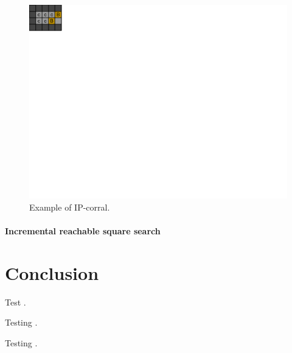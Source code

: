 \documentclass[a4paper,11pt]{article}
\renewcommand{\*}[0]{\cdot}
\begin{document}
\begin{figure}[h!]
    \begin{center}
        \includegraphics{figures/corralsIP}
    \end{center}
    \caption{Example of IP-corral.}
    \label{fig:corralsIP}
\end{figure}



\subsection{Incremental reachable square search}

\part*{Conclusion}





Test \cite{culberson1997}.

Testing \cite{russell2009}.

Testing \cite{takes2007}.
\end{document}
